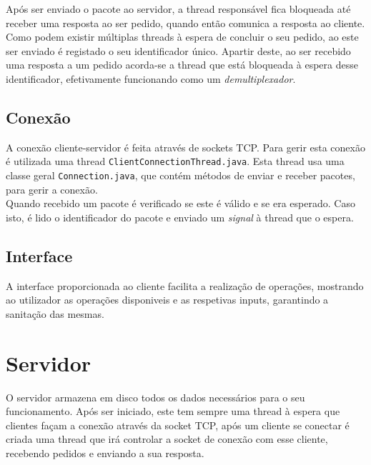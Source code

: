 \documentclass[runningheads]{llncs}
\begin{document}
Após ser enviado o pacote ao servidor, a thread responsável fica bloqueada até receber uma resposta ao ser pedido, quando então comunica a resposta ao cliente.
\\
Como podem existir múltiplas threads à espera de concluir o seu pedido, ao este ser enviado é registado o seu identificador único. Apartir deste, ao ser recebido uma resposta a um pedido acorda-se a thread que está bloqueada à espera desse identificador, efetivamente funcionando como um \emph{demultiplexador}.

\subsection{Conexão}
A conexão cliente-servidor é feita através de sockets TCP. Para gerir esta conexão é utilizada uma thread \texttt{ClientConnectionThread.java}. Esta thread usa uma classe geral \texttt{Connection.java}, que contém métodos de enviar e receber pacotes, para gerir a conexão.
\\ Quando recebido um pacote é verificado se este é válido e se era esperado. Caso isto, é lido o identificador do pacote e enviado um \emph{signal} à thread que o espera.


\subsection{Interface}
A interface proporcionada ao cliente facilita a realização de operações, mostrando ao utilizador as operações disponiveis e as respetivas inputs, garantindo a sanitação das mesmas.


\section{Servidor}
O servidor armazena em disco todos os dados necessários para o seu funcionamento.
Após ser iniciado, este tem sempre uma thread à espera que clientes façam a conexão através da socket TCP, após um cliente se conectar é criada uma thread que irá controlar a socket de conexão com esse cliente, recebendo pedidos e enviando a sua resposta.
\end{document}
